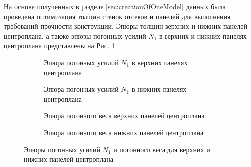 На основе полученных в разделе \ref{sec:creationOfOneModel} данных была проведена оптимизация толщин стенок отсеков и панелей для выполнения требований прочности конструкции. Эпюры толщин верхних и нижних панелей центроплана, а также эпюры погонных усилий $N_1$ в верхних и нижних панелях центроплана представлены на Рис. \ref{fig:epures}

\begin{figure}[H]
\centering
\captionsetup{justification=centering}
\begin{subfigure}[b]{0.49\textwidth}
	\centering
	\def\svgwidth{\textwidth}
	
	
	\caption{Эпюра погонных усилий $N_1$ в верхних панелях центроплана}
\end{subfigure}
\begin{subfigure}[b]{0.49\textwidth}
	\centering
	\def\svgwidth{\textwidth}
	
	\caption{Эпюра погонных усилий $N_1$ в нижних панелях центроплана}
\end{subfigure}
\begin{subfigure}[b]{0.49\textwidth}
	\centering
	\def\svgwidth{\textwidth}
	
	\caption{Эпюра погонного веса верхних панелей центроплана}
\end{subfigure}
\begin{subfigure}[b]{0.49\textwidth}
	\centering
	\def\svgwidth{\textwidth}		
	\caption{Эпюра погонного веса нижних панелей центроплана}
\end{subfigure}
	\caption{Эпюры погонных усилий $N_1$ и погонного веса для верхних и нижних панелей центроплана}
	\label{fig:epures}
\end{figure}
%
%
%	
%
%	
%
%	




